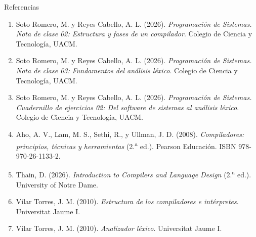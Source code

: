 \documentclass[11pt,spanish]{beamer}
\begin{document}
\begin{frame}{Referencias}
\vfill

\tiny
\begin{enumerate}
\item Soto Romero, M. y Reyes Cabello, A. L. (2026). \textit{Programación de Sistemas. Nota de clase 02: Estructura y fases de un compilador}. Colegio de Ciencia y Tecnología, UACM.
\item Soto Romero, M. y Reyes Cabello, A. L. (2026). \textit{Programación de Sistemas. Nota de clase 03: Fundamentos del análisis léxico}. Colegio de Ciencia y Tecnología, UACM.
\item Soto Romero, M. y Reyes Cabello, A. L. (2026). \textit{Programación de Sistemas. Cuadernillo de ejercicios 02: Del software de sistemas al análisis léxico}. Colegio de Ciencia y Tecnología, UACM.
\item Aho, A. V., Lam, M. S., Sethi, R., y Ullman, J. D. (2008). \textit{Compiladores: principios, técnicas y herramientas} (2.\textsuperscript{a} ed.). Pearson Educación. ISBN 978-970-26-1133-2.
\item Thain, D. (2026). \textit{Introduction to Compilers and Language Design} (2.\textsuperscript{a} ed.). University of Notre Dame.
\item Vilar Torres, J. M. (2010). \textit{Estructura de los compiladores e intérpretes}. Universitat Jaume I.
\item Vilar Torres, J. M. (2010). \textit{Analizador léxico}. Universitat Jaume I.
\end{enumerate}

\vfill
\end{frame}
\end{document}
